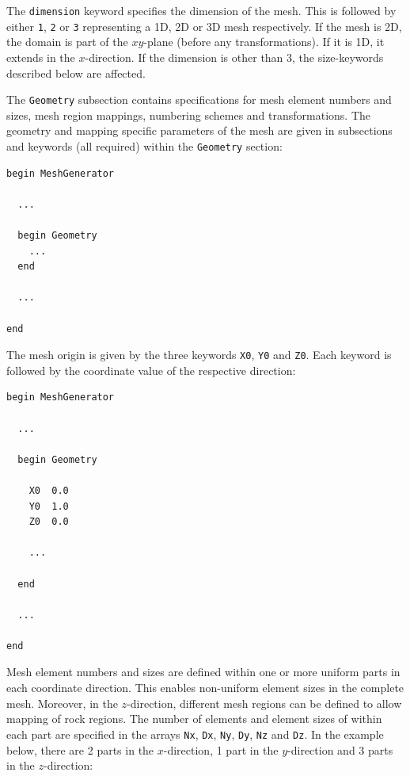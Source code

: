 
\label{sec:geometry-structured}

The \texttt{dimension} keyword specifies the dimension of the mesh. 
This is followed by either \texttt{1}, \texttt{2} or \texttt{3}
representing a 1D, 2D or 3D mesh respectively. If the mesh is 2D, the
domain is part of the $xy$-plane (before any transformations). If it
is 1D, it extends in the $x$-direction. If the dimension is other than
3, the size-keywords described below are affected. 

The \texttt{Geometry} subsection contains specifications for mesh
element numbers and sizes, mesh region mappings, numbering schemes and
transformations. The geometry and mapping specific parameters of the
mesh are given in subsections and keywords (all required) within the
\texttt{Geometry} section:

\begin{verbatim}
begin MeshGenerator

  ... 

  begin Geometry
    ... 
  end

  ... 

end
\end{verbatim}
%

\label{sec:struct-origin}

The mesh origin is given by the three keywords \texttt{X0},
\texttt{Y0} and \texttt{Z0}. Each keyword is followed by the
coordinate value of the respective direction:
%
\begin{verbatim}
begin MeshGenerator

  ... 

  begin Geometry

    X0  0.0
    Y0  1.0
    Z0  0.0

    ... 

  end

  ... 

end
\end{verbatim}

%

\label{sec:struct-sizes}

Mesh element numbers and sizes are defined within one or more uniform
parts in each coordinate direction. This enables non-uniform element
sizes in the complete mesh. Moreover, in the $z$-direction, different
mesh regions can be defined to allow mapping of rock regions. The
number of elements and element sizes of within each part are specified
in the arrays \texttt{Nx}, \texttt{Dx}, \texttt{Ny}, \texttt{Dy},
\texttt{Nz} and \texttt{Dz}. In the example below, there are 2 parts
in the $x$-direction, 1 part in the $y$-direction and 3 parts in the
$z$-direction:

